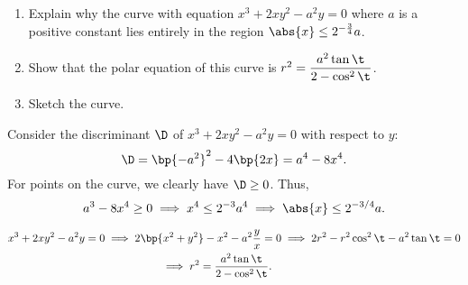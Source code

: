 \begin{problem}
    \begin{enumerate}
        \item Explain why the curve with equation $x^3 + 2xy^2 - a^2y = 0$ where $a$ is a positive constant lies entirely in the region $\abs{x} \leq 2^{-\frac34}a$.
        \item Show that the polar equation of this curve is $r^2 = \dfrac{a^2\tan\t}{2-\cos^2\t}$.
        \item Sketch the curve.
    \end{enumerate}
\end{problem}
\begin{solution}
    \begin{ppart}
        Consider the discriminant $\D$ of $x^3 + 2xy^2 - a^2 y = 0$ with respect to $y$: \[\D = \bp{-a^2}^2 - 4\bp{2x} = a^4 - 8x^4.\] For points on the curve, we clearly have $\D \geq 0$. Thus, \[a^3 - 8x^4 \geq 0 \implies x^4 \leq 2^{-3} a^4 \implies \abs{x} \leq 2^{-3/4} a.\]
    \end{ppart}
    \begin{ppart}
        \begin{align*}
            x^3 + 2xy^2 - a^2 y = 0 &\implies 2\bp{x^2 + y^2} - x^2 - a^2 \frac{y}{x} = 0 \implies 2r^2 - r^2\cos^2 \t - a^2 \tan \t = 0\\
            &\hspace{5em} \implies r^2 = \frac{a^2 \tan \t}{2 - \cos^2 \t}.
        \end{align*}
    \end{ppart}
    \begin{ppart}
        \begin{center}
        \end{center}
    \end{ppart}
\end{solution}

